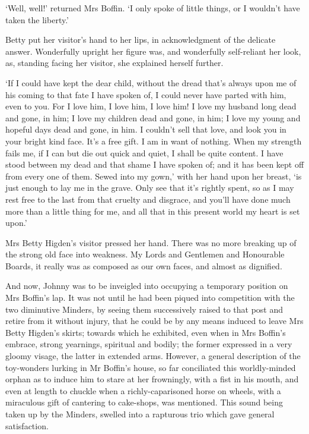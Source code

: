 ‘Well, well!’ returned Mrs Boffin. ‘I only spoke of little things, or I
wouldn’t have taken the liberty.’

Betty put her visitor’s hand to her lips, in acknowledgment of the
delicate answer. Wonderfully upright her figure was, and wonderfully
self-reliant her look, as, standing facing her visitor, she explained
herself further.

‘If I could have kept the dear child, without the dread that’s always
upon me of his coming to that fate I have spoken of, I could never have
parted with him, even to you. For I love him, I love him, I love him! I
love my husband long dead and gone, in him; I love my children dead and
gone, in him; I love my young and hopeful days dead and gone, in him. I
couldn’t sell that love, and look you in your bright kind face. It’s a
free gift. I am in want of nothing. When my strength fails me, if I
can but die out quick and quiet, I shall be quite content. I have stood
between my dead and that shame I have spoken of; and it has been kept
off from every one of them. Sewed into my gown,’ with her hand upon
her breast, ‘is just enough to lay me in the grave. Only see that it’s
rightly spent, so as I may rest free to the last from that cruelty and
disgrace, and you’ll have done much more than a little thing for me, and
all that in this present world my heart is set upon.’

Mrs Betty Higden’s visitor pressed her hand. There was no more breaking
up of the strong old face into weakness. My Lords and Gentlemen and
Honourable Boards, it really was as composed as our own faces, and
almost as dignified.

And now, Johnny was to be inveigled into occupying a temporary
position on Mrs Boffin’s lap. It was not until he had been piqued into
competition with the two diminutive Minders, by seeing them successively
raised to that post and retire from it without injury, that he could be
by any means induced to leave Mrs Betty Higden’s skirts; towards which
he exhibited, even when in Mrs Boffin’s embrace, strong yearnings,
spiritual and bodily; the former expressed in a very gloomy visage,
the latter in extended arms. However, a general description of the
toy-wonders lurking in Mr Boffin’s house, so far conciliated this
worldly-minded orphan as to induce him to stare at her frowningly,
with a fist in his mouth, and even at length to chuckle when a
richly-caparisoned horse on wheels, with a miraculous gift of cantering
to cake-shops, was mentioned. This sound being taken up by the Minders,
swelled into a rapturous trio which gave general satisfaction.

